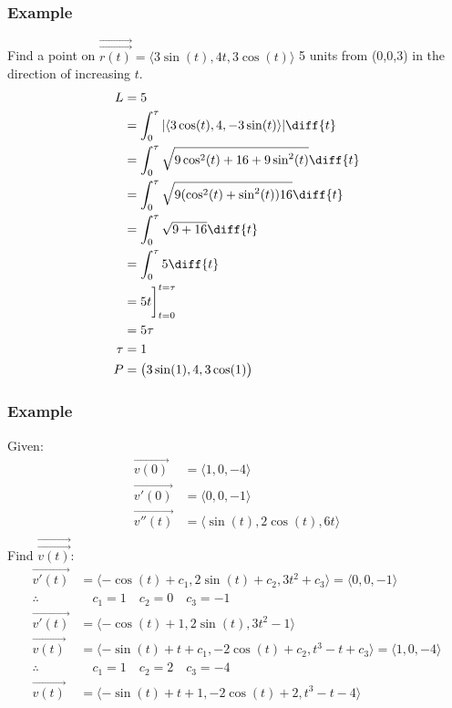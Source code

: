 \documentclass[letterpaper, 12pt]{math}
\begin{document}
\subsubsection*{Example}
Find a point on \( \overrightarrow{\vec{r(t)}} = \langle3\sin(t),4t,3\cos(t)
\rangle \) 5 units from (0,0,3) in the direction of increasing \( t \).
\begin{align*}
  L &= 5 \\
  &= \int_{0}^{\tau}|\langle3\cos(t),4,-3\sin(t)\rangle|\diff{t} \\
  &= \int_{0}^{\tau}\sqrt{9\cos^2(t)+16+9\sin^2(t)}\diff{t} \\
  &= \int_{0}^{\tau}\sqrt{9(\cos^2(t)+\sin^2(t))16}\diff{t} \\
  &= \int_{0}^{\tau}\sqrt{9+16}\diff{t} \\
  &= \int_{0}^{\tau}5\diff{t} \\
  &= 5t\bigg]_{t=0}^{t=\tau} \\
  &= 5\tau \\
  \tau &= 1 \\
  P &= \big(3\sin(1),4,3\cos(1)\big)
\end{align*}

\subsubsection*{Example}
Given:
\begin{align*}
  \overrightarrow{v(0)} &= \langle1,0,-4\rangle \\
  \overrightarrow{v'(0)} &= \langle0,0,-1\rangle \\
  \overrightarrow{v''(t)} &= \langle\sin(t),2\cos(t),6t\rangle \\
\end{align*}
Find \( \overrightarrow{\vec{v(t)}} \):
\begin{align*}
  \overrightarrow{v'(t)} &= \langle-\cos(t)+c_1,2\sin(t)+c_2,3t^2+c_3
    \rangle = \langle0,0,-1\rangle \\
  \therefore & \quad c_1 = 1 \quad c_2 = 0 \quad c_3 = -1 \\
  \overrightarrow{v'(t)} &= \langle-\cos(t)+1,2\sin(t),3t^2-1\rangle \\
  \overrightarrow{v(t)} &= \langle-\sin(t)+t+c_1,-2\cos(t)+c_2,t^3-t+c_3
    \rangle = \langle1,0,-4\rangle \\
  \therefore & \quad c_1 = 1 \quad c_2 = 2 \quad c_3 = -4 \\
  \overrightarrow{v(t)} &= \langle-\sin(t)+t+1,-2\cos(t)+2,t^3-t-4\rangle
\end{align*}
\end{document}
